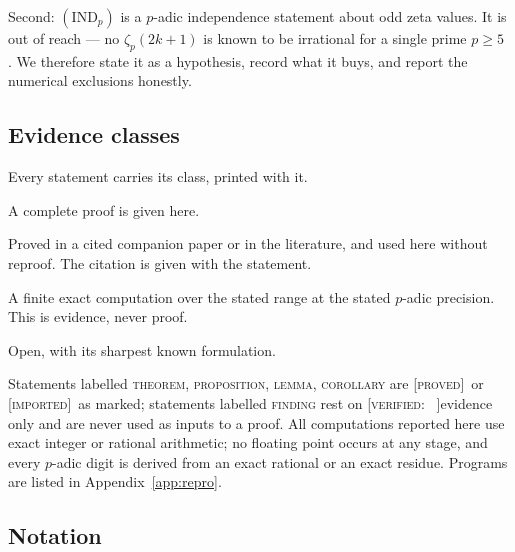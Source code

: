 \documentclass[11pt,reqno]{article}
\newcommand{\PROVED}{{\normalfont\textsc{[proved]}}}
\newcommand{\VER}[1]{{\normalfont\textsc{[verified:} #1\textsc{]}}}
\newcommand{\IMPORTED}{{\normalfont\textsc{[imported]}}}
\newcommand{\OPENTAG}{{\normalfont\textsc{[open]}}}
\theoremstyle{plain}
\theoremstyle{definition}
\theoremstyle{remark}
\numberwithin{equation}{section}
\begin{document}
Second: $(\mathrm{IND}_p)$ is a $p$-adic independence statement about odd zeta
values.  It is out of reach --- no $\zeta_p(2k+1)$ is known to be irrational for
a single prime $p\ge5$ \cite{Calegari2005,LSZ2025}.  We therefore state it as a
hypothesis, record what it buys, and report the numerical exclusions honestly.

\subsection{Evidence classes}\label{ss:evidence}

Every statement carries its class, printed with it.

\begin{description}[leftmargin=2.2em,style=nextline]
\item[\PROVED] A complete proof is given here.
\item[\IMPORTED] Proved in a cited companion paper or in the literature, and
  used here without reproof.  The citation is given with the statement.
\item[\VER{range}] A finite exact computation over the stated range at the
  stated $p$-adic precision.  This is evidence, never proof.
\item[\OPENTAG] Open, with its sharpest known formulation.
\end{description}

Statements labelled \textsc{theorem}, \textsc{proposition}, \textsc{lemma},
\textsc{corollary} are \PROVED\ or \IMPORTED\ as marked; statements labelled
\textsc{finding} rest on \VER\ evidence only and are never used as inputs to a
proof.  All computations reported here use exact integer or rational arithmetic;
no floating point occurs at any stage, and every $p$-adic digit is derived from
an exact rational or an exact residue.  Programs are listed in
Appendix~\ref{app:repro}.

\subsection{Notation}\label{ss:notation}
\end{document}
